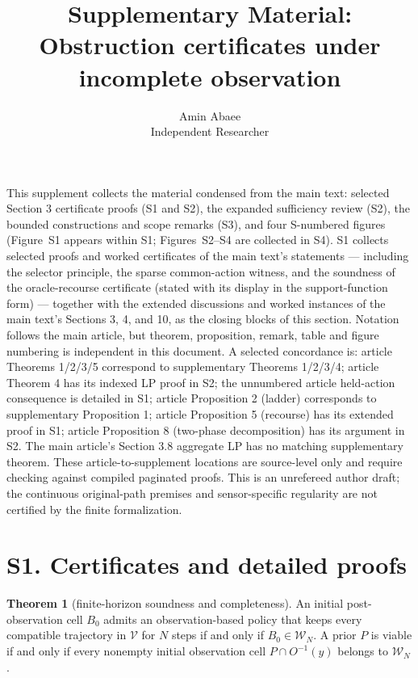 \documentclass[11pt]{article}
\theoremstyle{definition}
\newtheorem{theorem}{Theorem}
\begin{document}
\title{Supplementary Material: Obstruction certificates under incomplete observation}
\author{Amin Abaee\\[0.2em]{\small Independent Researcher}}
\maketitle

This supplement collects the material condensed from the main text: selected Section 3 certificate proofs (S1 and S2), the expanded sufficiency review (S2), the bounded constructions and scope remarks (S3), and four S-numbered figures (Figure~S1 appears within S1; Figures~S2--S4 are collected in S4). S1 collects selected proofs and worked certificates of the main text's statements --- including the selector principle, the sparse common-action witness, and the soundness of the oracle-recourse certificate (stated with its display in the support-function form) --- together with the extended discussions and worked instances of the main text's Sections 3, 4, and 10, as the closing blocks of this section. Notation follows the main article, but theorem, proposition, remark, table and figure numbering is independent in this document. A selected concordance is: article Theorems 1/2/3/5 correspond to supplementary Theorems 1/2/3/4; article Theorem 4 has its indexed LP proof in S2; the unnumbered article held-action consequence is detailed in S1; article Proposition 2 (ladder) corresponds to supplementary Proposition 1; article Proposition 5 (recourse) has its extended proof in S1; article Proposition 8 (two-phase decomposition) has its argument in S2. The main article's Section 3.8 aggregate LP has no matching supplementary theorem. These article-to-supplement locations are source-level only and require checking against compiled paginated proofs. This is an unrefereed author draft; the continuous original-path premises and sensor-specific regularity are not certified by the finite formalization.

\section*{S1. Certificates and detailed proofs}

\begin{theorem}[finite-horizon soundness and completeness]\label{thm:finite-horizon}
An initial post-observation cell \(B_0\) admits an observation-based
policy that keeps every compatible trajectory in \(\mathcal V\) for
\(N\) steps if and only if \(B_0\in\mathcal W_N\). A prior
\(P\) is viable if and only if every nonempty initial observation cell
\(P\cap O^{-1}(y)\) belongs to \(\mathcal W_N\).
\end{theorem}
\end{document}
